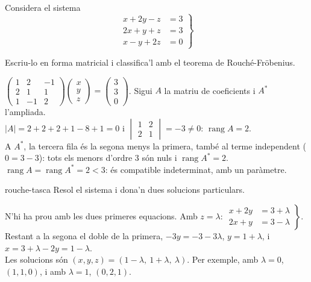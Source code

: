 Considera el sistema
\[
\left.\begin{aligned}
x+2y-z&=3\\
2x+y+z&=3\\
x-y+2z&=0
\end{aligned}\right\}
\]

\begin{apartats}

Escriu-lo en forma matricial i classifica'l amb el teorema de Rouché-Fröbenius.

\begin{solucio}
$\begin{pmatrix}1&2&-1\\2&1&1\\1&-1&2\end{pmatrix}\begin{pmatrix}x\\y\\z\end{pmatrix}=\begin{pmatrix}3\\3\\0\end{pmatrix}$.
Sigui $A$ la matriu de coeficients i $A^*$ l'ampliada.\\
$|A|=2+2+2+1-8+1=0$ i $\begin{vmatrix}1&2\\2&1\end{vmatrix}=-3\ne0$: $\operatorname{rang}A=2$.\\
A $A^*$, la tercera fila és la segona menys la primera, també al terme independent ($0=3-3$): tots els
menors d'ordre 3 són nuls i $\operatorname{rang}A^*=2$.\\
$\operatorname{rang}A=\operatorname{rang}A^*=2<3$: és compatible indeterminat, amb un paràmetre.
\end{solucio}

\begin{tria}{rouche-tasca}
Resol el sistema i dona'n dues solucions particulars.

\begin{solucio}
N'hi ha prou amb les dues primeres equacions. Amb $z=\lambda$:
$\left.\begin{aligned}x+2y&=3+\lambda\\2x+y&=3-\lambda\end{aligned}\right\}$. Restant a la segona el doble
de la primera, $-3y=-3-3\lambda$, $y=1+\lambda$, i $x=3+\lambda-2y=1-\lambda$.\\
Les solucions són $(x,y,z)=(1-\lambda,\ 1+\lambda,\ \lambda)$. Per exemple, amb $\lambda=0$, $(1,1,0)$, i
amb $\lambda=1$, $(0,2,1)$.
\end{solucio}


\end{tria}
\end{apartats}
